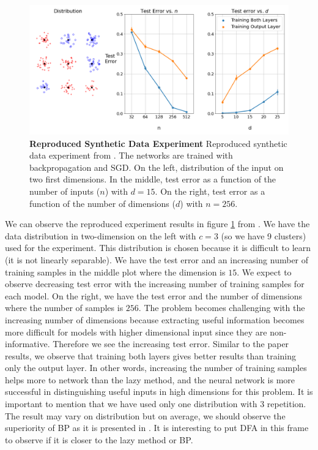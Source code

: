 \documentclass[a4paper, nobind]{templates/ociamthesis}
\begin{document}
\begin{figure}

{\centering \includegraphics[width=1\linewidth]{figures/2_syntheticData_reproduced} 

}

\caption[Reproduced Synthetic Data Experiment]{\textbf{Reproduced Synthetic Data Experiment} \newline Reproduced synthetic data experiment from \cite{chizat2020implicit}. The networks are trained with backpropagation and SGD. On the left, distribution of the input on two first dimensions. In the middle, test error as a function of the number of inputs ($n$) with $d=15$. On the right, test error as a function of the number of dimensions ($d$) with $n=256$.}\label{fig:randomData}
\end{figure}

\noindent We can observe the reproduced experiment results in figure \ref{fig:randomData} from \cite{chizat2020implicit}. We have the data distribution in two-dimension on the left with \(c=3\) (so we have 9 clusters) used for the experiment. This distribution is chosen because it is difficult to learn (it is not linearly separable). We have the test error and an increasing number of training samples in the middle plot where the dimension is \(15\). We expect to observe decreasing test error with the increasing number of training samples for each model. On the right, we have the test error and the number of dimensions where the number of samples is \(256\). The problem becomes challenging with the increasing number of dimensions because extracting useful information becomes more difficult for models with higher dimensional input since they are non-informative. Therefore we see the increasing test error. Similar to the paper results, we observe that training both layers gives better results than training only the output layer. In other words, increasing the number of training samples helps more to network than the lazy method, and the neural network is more successful in distinguishing useful inputs in high dimensions for this problem. It is important to mention that we have used only one distribution with \(3\) repetition. The result may vary on distribution but on average, we should observe the superiority of BP as it is presented in \cite{chizat2020implicit}. It is interesting to put DFA in this frame to observe if it is closer to the lazy method or BP.\\
\end{document}
